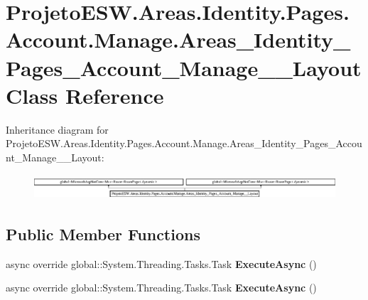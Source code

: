 \hypertarget{class_projeto_e_s_w_1_1_areas_1_1_identity_1_1_pages_1_1_account_1_1_manage_1_1_areas___identityc6380326995a7c32954b2e75619ca337}{}\section{Projeto\+E\+S\+W.\+Areas.\+Identity.\+Pages.\+Account.\+Manage.\+Areas\+\_\+\+Identity\+\_\+\+Pages\+\_\+\+Account\+\_\+\+Manage\+\_\+\+\_\+\+Layout Class Reference}
\label{class_projeto_e_s_w_1_1_areas_1_1_identity_1_1_pages_1_1_account_1_1_manage_1_1_areas___identityc6380326995a7c32954b2e75619ca337}
Inheritance diagram for Projeto\+E\+S\+W.\+Areas.\+Identity.\+Pages.\+Account.\+Manage.\+Areas\+\_\+\+Identity\+\_\+\+Pages\+\_\+\+Account\+\_\+\+Manage\+\_\+\+\_\+\+Layout\+:\begin{figure}[H]
\begin{center}
\leavevmode
\includegraphics[height=0.941176cm]{class_projeto_e_s_w_1_1_areas_1_1_identity_1_1_pages_1_1_account_1_1_manage_1_1_areas___identityc6380326995a7c32954b2e75619ca337}
\end{center}
\end{figure}
\subsection*{Public Member Functions}
\begin{DoxyCompactItemize}
\item 
\mbox{\label{class_projeto_e_s_w_1_1_areas_1_1_identity_1_1_pages_1_1_account_1_1_manage_1_1_areas___identityc6380326995a7c32954b2e75619ca337_a0a8fdfd966cc5ae75068d4c23eb11b35}} 
async override global\+::\+System.\+Threading.\+Tasks.\+Task {\bfseries Execute\+Async} ()
\item 
\mbox{\label{class_projeto_e_s_w_1_1_areas_1_1_identity_1_1_pages_1_1_account_1_1_manage_1_1_areas___identityc6380326995a7c32954b2e75619ca337_a0a8fdfd966cc5ae75068d4c23eb11b35}} 
async override global\+::\+System.\+Threading.\+Tasks.\+Task {\bfseries Execute\+Async} ()
\end{DoxyCompactItemize}

